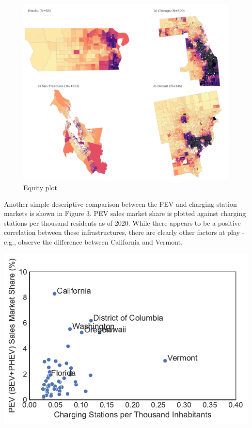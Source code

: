 \documentclass[
  letterpaper,
  DIV=11,
  numbers=noendperiod]{scrartcl}
\begin{document}
\begin{figure}

{\centering \includegraphics{TRB_2023_files/figure-pdf/fig-equity-output-1.png}

}

\caption{\label{fig-equity}Equity plot}

\end{figure}

Another simple descriptive comparison between the PEV and charging
station markets is shown in Figure 3. PEV sales market share is plotted
against charging stations per thousand residents as of 2020. While there
appears to be a positive correlation between these infrastructures,
there are clearly other factors at play - e.g., observe the difference
between California and Vermont.

\includegraphics{TRB_2023_files/figure-pdf/cell-13-output-1.pdf}
\end{document}
